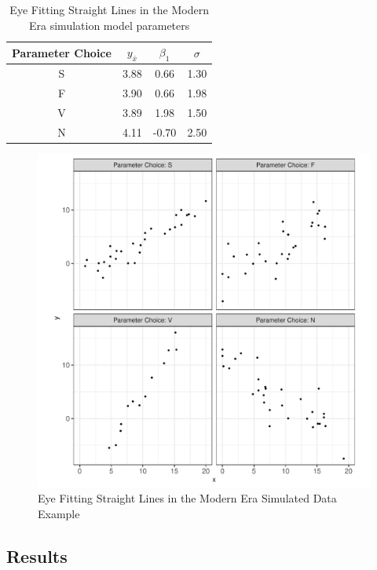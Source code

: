 \documentclass[print]{nuthesis}
\begin{document}
\begin{table}

\caption{\label{tab:eyefitting-parameters}Eye Fitting Straight Lines in the Modern Era simulation model parameters}
\centering
\begin{tabular}[t]{cccc}
\toprule
Parameter Choice & $y_{\bar{x}}$ & $\beta_1$ & $\sigma$\\
\midrule
S & 3.88 & 0.66 & 1.30\\
F & 3.90 & 0.66 & 1.98\\
V & 3.89 & 1.98 & 1.50\\
N & 4.11 & -0.70 & 2.50\\
\bottomrule
\end{tabular}
\end{table}

\begin{figure}[tbp]

{\centering \includegraphics[width=0.75\linewidth,]{thesis_files/figure-latex/eyefitting-simplot-1} 

}

\caption{Eye Fitting Straight Lines in the Modern Era Simulated Data Example}\label{fig:eyefitting-simplot}
\end{figure}

\hypertarget{results-1}{%
\subsection{Results}\label{results-1}}
\end{document}
